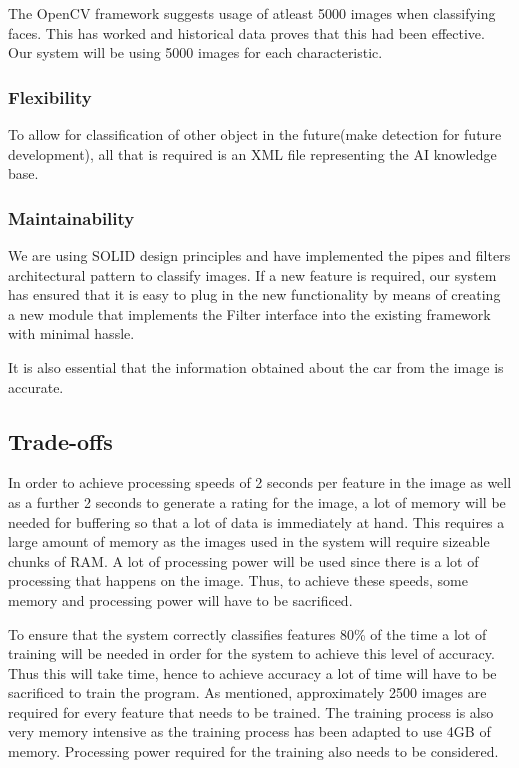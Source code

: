 The OpenCV framework suggests usage of atleast 5000 images when classifying faces. This has worked and historical data proves that this had been effective. Our system will be using 5000 images for each characteristic.

\subsubsection{Flexibility}
To allow for classification of other object in the future(make detection for future development), all that is required is an XML file representing the AI knowledge base.

\subsubsection{Maintainability}
We are using SOLID design principles and have implemented the pipes and filters architectural pattern to classify images. If a new feature is required, our system has ensured that it is easy to plug in the new functionality by means of creating a new module that implements the Filter interface into the existing framework with minimal hassle.

It is also essential that the information obtained about the car from the image is accurate.

\subsection{Trade-offs}
In order to achieve processing speeds of 2 seconds per feature in the image as well as a further 2 seconds to generate a rating for the image, a lot of memory will be needed for buffering so that a lot of data is immediately at hand. This requires a large amount of memory as the images used in the system  will require sizeable chunks of RAM. A lot of processing power will be used since there is a lot of processing that happens on the image. Thus, to achieve these speeds, some memory and processing power will have to be sacrificed.

To ensure that the system correctly classifies features 80\% of the time a lot of training will be needed in order for the system to achieve this level of accuracy. Thus this will take time, hence to achieve accuracy a lot of time will have to be sacrificed to train the program. As mentioned, approximately 2500 images are required for every feature that needs to be trained. The training process is also very memory intensive as the training process has been adapted to use 4GB of memory. Processing power required for the training also needs to be considered.

